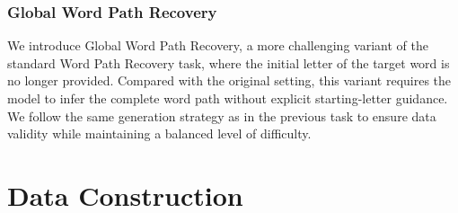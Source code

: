 \subsubsection{Global Word Path Recovery}
We introduce  Global Word Path Recovery, a more challenging variant of the standard Word Path Recovery task, where the initial letter of the target word is no longer provided. Compared with the original setting, this variant requires the model to infer the complete word path without explicit starting-letter guidance. We follow the same generation strategy as in the previous task to ensure data validity while maintaining a balanced level of difficulty.

\section{{\rmbench} Data Construction}
\label{supp: EditReward-Compass Data Construction}
\begin{table}[t]
\centering
\caption{Reward Model Benchmark Sampling Configuration.}
\label{tab:reward_model_benchmark_sampling_config}
\end{table}

